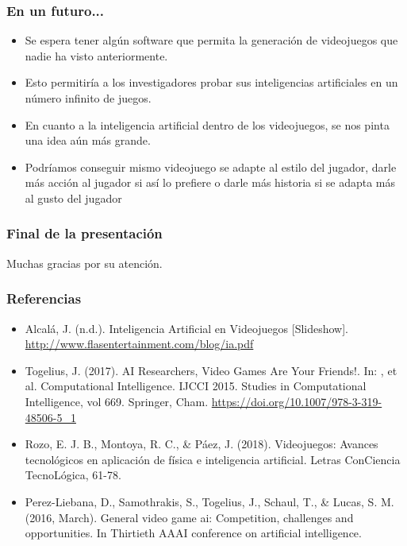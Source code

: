\documentclass[aspectratio=169]{beamer}
\begin{document}
\begin{frame}
\frametitle{En un futuro...}
\begin{itemize}[<+->]
\item Se espera tener algún software que permita la generación de videojuegos
  que nadie ha visto anteriormente.
\item Esto permitiría a los investigadores probar sus inteligencias artificiales
  en un número infinito de juegos.
\item En cuanto a la inteligencia artificial dentro de los videojuegos, se nos
  pinta una idea aún más grande.
\item Podríamos conseguir mismo videojuego se adapte al estilo del jugador,
  darle más acción al jugador si así lo prefiere o darle más historia si se adapta
  más al gusto del jugador
\end{itemize}
\end{frame}


\begin{frame}
\frametitle{Final de la presentación}

Muchas gracias por su atención.
\end{frame}

\begin{frame}
\frametitle{Referencias}
\begin{itemize}
\item Alcalá, J. (n.d.). Inteligencia Artificial en Videojuegos [Slideshow]. 
\url{http://www.flasentertainment.com/blog/ia.pdf}
\item Togelius, J. (2017). AI Researchers, Video Games Are Your Friends!. In: , et al. 
Computational Intelligence. IJCCI 2015. Studies in Computational Intelligence, vol 669. 
Springer, Cham. \url{https://doi.org/10.1007/978-3-319-48506-5\_1} 
\item Rozo, E. J. B., Montoya, R. C., \& Páez, J. (2018). Videojuegos: Avances tecnológicos en 
aplicación de física e inteligencia artificial. Letras ConCiencia TecnoLógica, 61-78.
\item Perez-Liebana, D., Samothrakis, S., Togelius, J., Schaul, T., \& Lucas, S. M. 
(2016, March). General video game ai: Competition, challenges and opportunities. 
In Thirtieth AAAI conference on artificial intelligence.
\end{itemize}
\end{frame}
\end{document}
